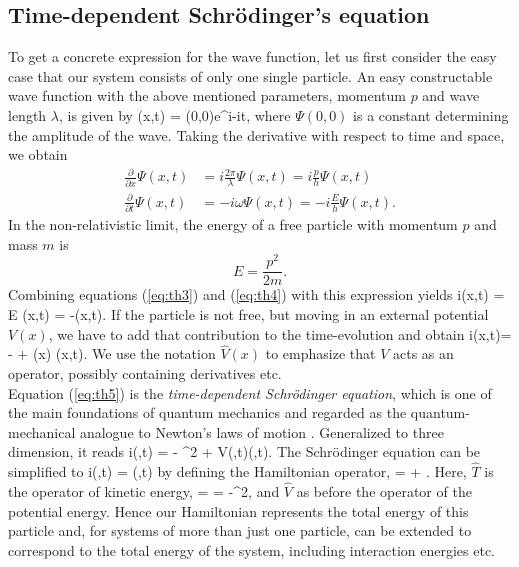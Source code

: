 \subsection{Time-dependent Schr\"odinger's equation}
To get a concrete expression for the wave function, let us first
 consider the easy case that our system consists of only one single particle.
An easy constructable wave function with the above mentioned parameters, momentum $p$ and wave length $\lambda$, is given by
\be 
\Psi(x,t) = \Psi(0,0)e^{i-i\omega t},
\label{eq:th2}
\ee
where $\Psi(0,0)$ is a constant determining the amplitude of the wave. Taking the derivative with respect to time and space, we obtain
\begin{align}
\frac{\partial}{\partial x}\Psi(x,t) &= i \frac{2\pi}{\lambda} \Psi(x,t) = i \frac{p}{h} \Psi(x,t)
\label{eq:th3}\\
\frac{\partial}{\partial t}\Psi(x,t) &= -i\omega\Psi(x,t) = -i \frac{E}{h}\Psi(x,t).
\label{eq:th4}
\end{align}
In the non-relativistic limit, the energy of a free particle with momentum $p$ and mass $m$ is 
\[
E = \frac{p^2}{2m}.
\]
Combining equations (\ref{eq:th3}) and (\ref{eq:th4}) with this expression yields
\be 
i\hbar {}\Psi(x,t) = E \Psi(x,t) = -\Psi(x,t).
\label{eq:th5}
\ee
If the particle is not free, but moving in an external potential $V(x)$, we have to add that contribution to the time-evolution and obtain
\be 
i\hbar {}\Psi(x,t)=  -\lb {} + (x) \rb \Psi(x,t).
\label{eq:th5}
\ee
We use the notation $\hat{V}(x)$ to emphasize that $V$ acts as an operator, possibly containing derivatives etc.\\
Equation (\ref{eq:th5}) is the \textit{time-dependent Schr\"odinger equation}, which is one of the main foundations of quantum mechanics and regarded as the quantum-mechanical analogue to Newton's laws of motion . Generalized to three dimension, it reads
\be 
i\hbar {}\Psi(\rv,t) = - \lb{}\nabla^2 + V(\rv,t)\rb \Psi(\rv,t).
\ee
The Schr\"odinger equation can be simplified to
\be  
i\hbar {}\Psi(\rv,t) = \Psi(\rv,t)
\label{eq:th6}
\ee
by defining the Hamiltonian operator,
\be  
{} =  + 
\label{eq:th7}.
\ee
Here, $\hat{T}$ is the operator of kinetic energy,
\be
{} =  = -\nabla^2,
\label{eq:th72}
\ee
and $\hat{V}$ as before the operator of the potential energy. Hence our Hamiltonian represents the total energy of this particle and, for systems of more than just one particle, can be extended to correspond to the total energy of the system, including interaction energies etc.

